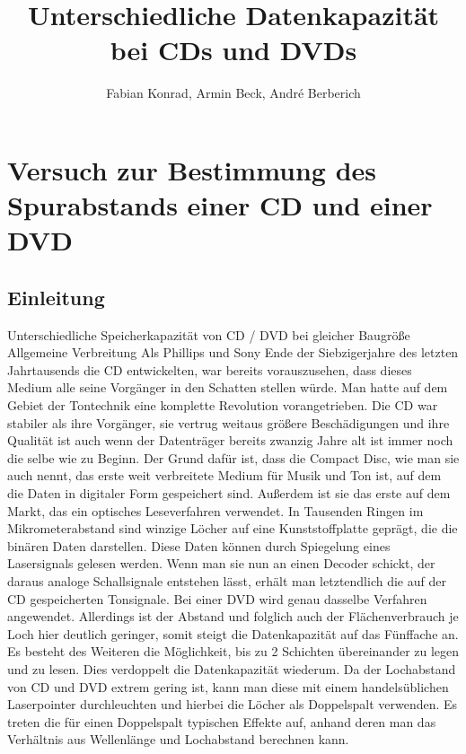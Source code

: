 \documentclass{scrreprt}
\author{Fabian Konrad, Armin Beck, André Berberich}
\title{Unterschiedliche Datenkapazität bei CDs und DVDs}
\begin{document}
\maketitle
\newpage

\chapter{Versuch zur Bestimmung des Spurabstands einer CD und einer DVD}



\section{Einleitung}
Unterschiedliche Speicherkapazität von CD / DVD bei gleicher Baugröße
Allgemeine Verbreitung
Als Phillips und Sony Ende der Siebzigerjahre des letzten Jahrtausends die CD entwickelten, war bereits vorauszusehen, dass dieses Medium alle seine Vorgänger in den Schatten stellen würde. Man hatte auf dem Gebiet der Tontechnik eine komplette Revolution vorangetrieben. Die CD war stabiler als ihre Vorgänger, sie vertrug weitaus größere Beschädigungen und ihre Qualität ist auch wenn der Datenträger bereits zwanzig Jahre alt ist immer noch die selbe wie zu Beginn. Der Grund dafür ist, dass die Compact Disc, wie man sie auch nennt, das erste weit verbreitete Medium für Musik und Ton ist, auf dem die Daten in digitaler Form gespeichert sind. Außerdem ist sie das erste auf dem Markt, das ein optisches Leseverfahren verwendet. In Tausenden Ringen im Mikrometerabstand sind winzige Löcher auf eine Kunststoffplatte geprägt, die die binären Daten darstellen. Diese Daten können durch Spiegelung eines Lasersignals gelesen werden. Wenn man sie nun an einen Decoder schickt, der daraus analoge Schallsignale entstehen lässt, erhält man letztendlich die auf der CD gespeicherten Tonsignale. Bei einer DVD wird genau dasselbe Verfahren angewendet. Allerdings ist der Abstand und folglich auch der Flächenverbrauch je Loch hier deutlich geringer, somit steigt die Datenkapazität auf das Fünffache an. Es besteht des Weiteren die Möglichkeit, bis zu 2 Schichten übereinander zu legen und zu lesen. Dies verdoppelt die Datenkapazität wiederum. Da der Lochabstand von CD und DVD extrem gering ist, kann man diese mit einem handelsüblichen Laserpointer durchleuchten und hierbei die Löcher als Doppelspalt verwenden. Es treten die für einen Doppelspalt typischen Effekte auf, anhand deren man das Verhältnis aus Wellenlänge und Lochabstand berechnen kann.
\end{document}
